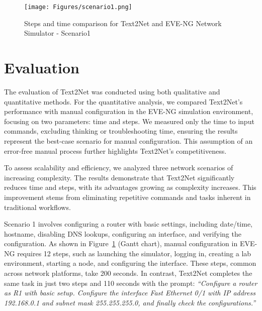 
\begin{figure}[t]
    \centering
    \texttt{[image: Figures/scenario1.png]}
    \caption{Steps and time comparison for Text2Net and EVE-NG Network Simulator - Scenario1}
    \vspace{-4mm}
    \label{fig: scenario1}
\end{figure}

\section{Evaluation}
The evaluation of Text2Net was conducted using both qualitative and quantitative methods. For the quantitative analysis, we compared Text2Net’s performance with manual configuration in the EVE-NG simulation environment, focusing on two parameters: time and steps. We measured only the time to input commands, excluding thinking or troubleshooting time, ensuring the results represent the best-case scenario for manual configuration. This assumption of an error-free manual process further highlights Text2Net’s competitiveness.

To assess scalability and efficiency, we analyzed three network scenarios of increasing complexity. The results demonstrate that Text2Net significantly reduces time and steps, with its advantages growing as complexity increases. This improvement stems from eliminating repetitive commands and tasks inherent in traditional workflows.

Scenario 1 involves configuring a router with basic settings, including date/time, hostname, disabling DNS lookups, configuring an interface, and verifying the configuration. As shown in Figure~\ref{fig: scenario1} (Gantt chart), manual configuration in EVE-NG requires 12 steps, such as launching the simulator, logging in, creating a lab environment, starting a node, and configuring the interface. These steps, common across network platforms, take 200 seconds.
In contrast, Text2Net completes the same task in just two steps and 110 seconds with the prompt:
\textit{“Configure a router as R1 with basic setup. Configure the interface Fast Ethernet 0/1 with IP address 192.168.0.1 and subnet mask 255.255.255.0, and finally check the configurations.”}



